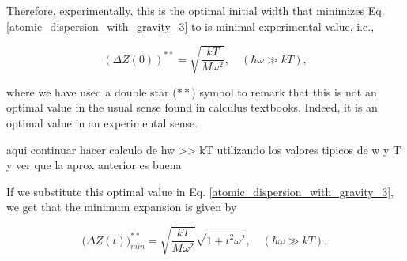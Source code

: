 \documentclass{article}
\begin{document}
Therefore, experimentally, this is the optimal initial width that minimizes Eq. \ref{atomic_dispersion_with_gravity_3} to is minimal experimental value, i.e.,

\begin{equation}\label{eq_optimal_initial_width}
    (\Delta Z (0))^{**} = \sqrt{\frac{ kT}{ M \omega^{2}} }, \quad (\hbar \omega \gg kT),
\end{equation}

where we have used a double star ($**$) symbol to remark that this is not an optimal value in the usual sense found in calculus textbooks. Indeed, it is an optimal value in an experimental sense. 

aqui continuar hacer calculo de hw >> kT utilizando los valores tipicos de w y T y ver que la aprox anterior es buena

If we substitute this optimal value in Eq. \ref{atomic_dispersion_with_gravity_3}, we get that the minimum expansion is given by

\begin{equation}
    \big( \Delta Z (t) \big)^{**}_{min} = \sqrt{\frac{ kT}{ M \omega^{2}} } \sqrt{1+t^{2}\omega^{2}}, \quad (\hbar \omega \gg kT) ,
\end{equation}

\end{document}
